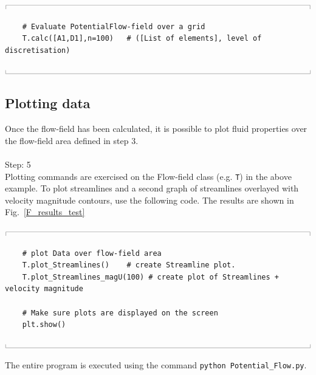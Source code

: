 \documentclass[10pt,a4paper]{article}
\newcommand{\topbar}{\ensuremath{
    \rule{0.1mm}{2.0mm} \rule[2.0mm]{159.5mm}{0.1mm} \rule{0.1mm}{2.0mm}
}}
\newcommand{\bottombar}{\ensuremath{
    \rule{0.1mm}{2.0mm} \rule{159.5mm}{0.1mm} \rule{0.1mm}{2.0mm}
}}
\begin{document}
\noindent
\topbar
\begin{lstlisting}
    # Evaluate PotentialFlow-field over a grid
    T.calc([A1,D1],n=100)   # ([List of elements], level of discretisation)
\end{lstlisting}
\bottombar


\subsection{Plotting data}

Once the flow-field has been calculated, it is possible to plot fluid properties over the flow-field area defined in step 3. 
\\ \\
\noindent
{\huge Step: 5}\\
Plotting commands are exercised on the Flow-field class (e.g. \verb'T') in the above example. 
To plot streamlines and a second graph of streamlines overlayed with velocity magnitude contours, use the following code. The results are shown in Fig.~\ref{F_results_test}

\noindent
\topbar
\begin{lstlisting}
    # plot Data over flow-field area
    T.plot_Streamlines()    # create Streamline plot.
    T.plot_Streamlines_magU(100) # create plot of Streamlines + velocity magnitude

    # Make sure plots are displayed on the screen
    plt.show()
\end{lstlisting}
\bottombar

\noindent
The entire program is executed using the command \verb'python Potential_Flow.py'. 
\end{document}
